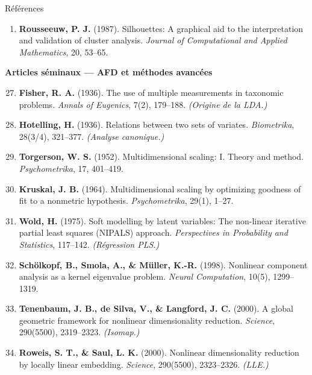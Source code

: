\begin{frame}[allowframebreaks]{Références}
\begin{enumerate}
  \item \textbf{Rousseeuw, P. J.} (1987).
        Silhouettes: A graphical aid to the interpretation and validation of
        cluster analysis. \textit{Journal of Computational and Applied Mathematics},
        20, 53--65.
\end{enumerate}

\framebreak

\textbf{\large Articles séminaux — AFD et méthodes avancées}\\[6pt]

\begin{enumerate}
  \setcounter{enumi}{26}
  \item \textbf{Fisher, R. A.} (1936).
        The use of multiple measurements in taxonomic problems.
        \textit{Annals of Eugenics}, 7(2), 179--188. \emph{(Origine de la LDA.)}

  \item \textbf{Hotelling, H.} (1936).
        Relations between two sets of variates.
        \textit{Biometrika}, 28(3/4), 321--377. \emph{(Analyse canonique.)}

  \item \textbf{Torgerson, W. S.} (1952).
        Multidimensional scaling: I. Theory and method.
        \textit{Psychometrika}, 17, 401--419.

  \item \textbf{Kruskal, J. B.} (1964).
        Multidimensional scaling by optimizing goodness of fit to a nonmetric hypothesis.
        \textit{Psychometrika}, 29(1), 1--27.

  \item \textbf{Wold, H.} (1975).
        Soft modelling by latent variables: The non-linear iterative partial
        least squares (NIPALS) approach. \textit{Perspectives in Probability
        and Statistics}, 117--142. \emph{(Régression PLS.)}

  \item \textbf{Schölkopf, B., Smola, A., \& Müller, K.-R.} (1998).
        Nonlinear component analysis as a kernel eigenvalue problem.
        \textit{Neural Computation}, 10(5), 1299--1319.

  \item \textbf{Tenenbaum, J. B., de Silva, V., \& Langford, J. C.} (2000).
        A global geometric framework for nonlinear dimensionality reduction.
        \textit{Science}, 290(5500), 2319--2323. \emph{(Isomap.)}

  \item \textbf{Roweis, S. T., \& Saul, L. K.} (2000).
        Nonlinear dimensionality reduction by locally linear embedding.
        \textit{Science}, 290(5500), 2323--2326. \emph{(LLE.)}


\end{enumerate}
\end{frame}
